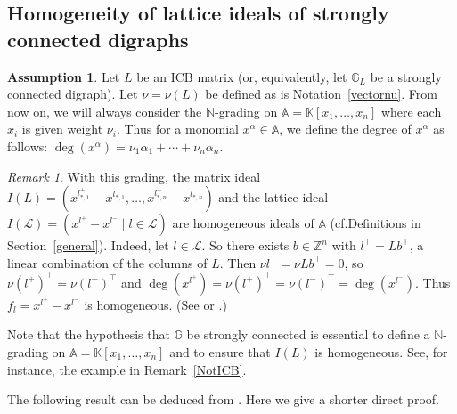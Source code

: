 \documentclass[10pt]{amsart}
\newcommand{\cf}{cf.}
\newcommand{\mbn}{\mbox{$\mathbb{N}$}}
\newcommand{\mbz}{\mbox{$\mathbb{Z}$}}
\newcommand{\mbk}{\mbox{$\mathbb{K}$}}
\newcommand{\mba}{\mbox{$\mathbb{A}$}}
\newcommand{\mbg}{\mbox{$\mathbb{G}$}}
\newcommand{\mcl}{\mbox{$\mathcal{L}$}}
\newcommand{\icb}{\mbox{$\mathrm{ICB}$}}
\theoremstyle{definition}
\newtheorem{assumption}[cdrthm]{Assumption}
\theoremstyle{remark}
\newtheorem{remark}[cdrthm]{Remark}
\begin{document}
\subsection{Homogeneity of lattice ideals of strongly connected digraphs}
\label{hom-scd}\phantom{+}%

\begin{assumption}\label{grading}
Let $L$ be an $\icb$ matrix (or, equivalently, let $\mbg_L$ be a
strongly connected digraph). Let $\nu=\nu(L)$ be defined as is
Notation~\ref{vectornu}. From now on, we will always consider the
$\mbn$-grading on $\mba=\mbk[x_1,\ldots ,x_n]$ where each $x_i$ is
given weight $\nu_i$. Thus for a monomial $x^\alpha\in \mba$, we
define the degree of $x^\alpha$ as follows:
$\deg(x^\alpha)=\nu_1\alpha_1+\cdots+\nu_n\alpha_n$.
\end{assumption}

\begin{remark}\label{ILhomogeneous}
With this grading, the matrix ideal
$I(L)=(x^{l_{*,1}^+}-x^{l_{*,1}^-},\ldots
,x^{l_{*,n}^+}-x^{l_{*,n}^-})$ and the lattice ideal
$I(\mcl)=(x^{l^+}-x^{l^-}\mid l\in\mcl)$ are homogeneous ideals of
$\mba$ (\cf Definitions in Section~\ref{general}). Indeed, let
$l\in\mcl$. So there exists $b\in \mbz^n$ with $l^{\top}=Lb^{\top}$, a
linear combination of the columns of $L$.  Then $\nu l^{\top}=\nu
Lb^{\top}=0$, so $\nu (l^{+})^{\top}=\nu (l^{-})^{\top}$ and
$\deg(x^{l^{+}})=\nu (l^{+})^{\top}=\nu
(l^-)^{\top}=\deg(x^{l^-})$. Thus $f_l=x^{l^+}-x^{l^-}$ is
homogeneous. (See \cite[Definition~2.2]{op} or
\cite[Remark~5.6]{opv}.)
\end{remark}

Note that the hypothesis that $\mbg$ be strongly connected is
essential to define a $\mbn$-grading on $\mba=\mbk[x_1,\ldots ,x_n]$
and to ensure that $I(L)$ is homogeneous. See, for instance, the
example in Remark~\ref{NotICB}.

The following result can be deduced from
\cite[Proposition~7.6]{opv}. Here we give a shorter direct proof.
\end{document}
